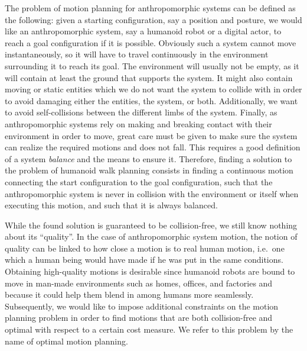 The problem of motion planning for anthropomorphic systems can be
defined as the following: given a starting configuration, say a
position and posture, we would like an anthropomorphic system, say a
humanoid robot or a digital actor, to reach a goal configuration if it
is possible. Obviously such a system cannot move instantaneously, so
it will have to travel continuously in the environment surrounding it
to reach its goal. The environment will usually not be empty, as it
will contain at least the ground that supports the system. It might
also contain moving or static entities which we do not want the
system to collide with in order to avoid damaging either the entities, the
system, or both. Additionally, we want to avoid self-collisions
between the different limbs of the system. Finally, as anthropomorphic
systems rely on making and breaking contact with their environment in
order to move, great care must be given to make sure the system can
realize the required motions and does not fall. This requires a good
definition of a system \emph{balance} and the means to ensure
it. Therefore, finding a solution to the problem of humanoid walk
planning consists in finding a continuous motion connecting the start
configuration to the goal configuration, such that the anthropomorphic
system is never in collision with the environment or itself when
executing this motion, and such that it is always balanced.

While the found solution is guaranteed to be collision-free, we still
know nothing about its ``quality''. In the case of anthropomorphic
system motion, the notion of quality can be linked to how close a
motion is to real human motion, i.e.\ one which a human being would
have made if he was put in the same conditions. Obtaining high-quality
motions is desirable since humanoid robots are bound to move in
man-made environments such as homes, offices, and factories and
because it could help them blend in among humans more
seamlessly. Subsequently, we would like to impose additional
constraints on the motion planning problem in order to find motions
that are both collision-free and optimal with respect to a certain
cost measure. We refer to this problem by the name of optimal motion
planning.

